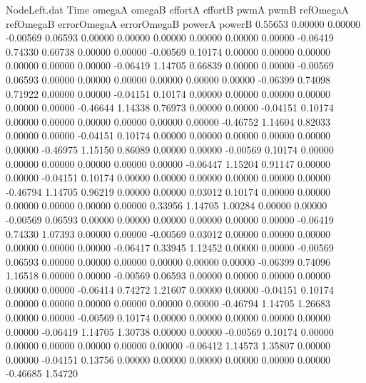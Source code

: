 \begin{filecontents}{NodeLeft.dat}
Time omegaA omegaB effortA effortB pwmA pwmB refOmegaA refOmegaB errorOmegaA errorOmegaB powerA powerB
   0.55653    0.00000    0.00000    -0.00569    0.06593    0.00000    0.00000    0.00000    0.00000    0.00000    0.00000   -0.06419    0.74330
   0.60738    0.00000    0.00000    -0.00569    0.10174    0.00000    0.00000    0.00000    0.00000    0.00000    0.00000   -0.06419    1.14705
   0.66839    0.00000    0.00000    -0.00569    0.06593    0.00000    0.00000    0.00000    0.00000    0.00000    0.00000   -0.06399    0.74098
   0.71922    0.00000    0.00000    -0.04151    0.10174    0.00000    0.00000    0.00000    0.00000    0.00000    0.00000   -0.46644    1.14338
   0.76973    0.00000    0.00000    -0.04151    0.10174    0.00000    0.00000    0.00000    0.00000    0.00000    0.00000   -0.46752    1.14604
   0.82033    0.00000    0.00000    -0.04151    0.10174    0.00000    0.00000    0.00000    0.00000    0.00000    0.00000   -0.46975    1.15150
   0.86089    0.00000    0.00000    -0.00569    0.10174    0.00000    0.00000    0.00000    0.00000    0.00000    0.00000   -0.06447    1.15204
   0.91147    0.00000    0.00000    -0.04151    0.10174    0.00000    0.00000    0.00000    0.00000    0.00000    0.00000   -0.46794    1.14705
   0.96219    0.00000    0.00000     0.03012    0.10174    0.00000    0.00000    0.00000    0.00000    0.00000    0.00000    0.33956    1.14705
   1.00284    0.00000    0.00000    -0.00569    0.06593    0.00000    0.00000    0.00000    0.00000    0.00000    0.00000   -0.06419    0.74330
   1.07393    0.00000    0.00000    -0.00569    0.03012    0.00000    0.00000    0.00000    0.00000    0.00000    0.00000   -0.06417    0.33945
   1.12452    0.00000    0.00000    -0.00569    0.06593    0.00000    0.00000    0.00000    0.00000    0.00000    0.00000   -0.06399    0.74096
   1.16518    0.00000    0.00000    -0.00569    0.06593    0.00000    0.00000    0.00000    0.00000    0.00000    0.00000   -0.06414    0.74272
   1.21607    0.00000    0.00000    -0.04151    0.10174    0.00000    0.00000    0.00000    0.00000    0.00000    0.00000   -0.46794    1.14705
   1.26683    0.00000    0.00000    -0.00569    0.10174    0.00000    0.00000    0.00000    0.00000    0.00000    0.00000   -0.06419    1.14705
   1.30738    0.00000    0.00000    -0.00569    0.10174    0.00000    0.00000    0.00000    0.00000    0.00000    0.00000   -0.06412    1.14573
   1.35807    0.00000    0.00000    -0.04151    0.13756    0.00000    0.00000    0.00000    0.00000    0.00000    0.00000   -0.46685    1.54720

\end{filecontents}
